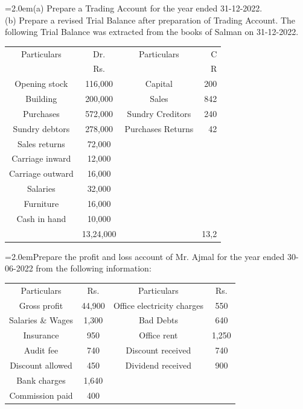 \documentclass[11pt,a4paper]{article}
\newcommand{\lqn}[2]{\Needspace{6\baselineskip}\par\medskip\noindent\hangindent=2.0em\hangafter=1\makebox[2.0em][l]{\textbf{#1.}}#2\par}
\begin{document}
\lqn{82}{(a) Prepare a Trading Account for the year ended 31-12-2022.\\
(b) Prepare a revised Trial Balance after preparation of Trading Account. The following Trial Balance was extracted from the books of Salman on 31-12-2022.\par
\par\smallskip\noindent\hspace*{1.2em}\begin{tabular}{|cccr|}
\hline
Particulars & Dr. & Particulars & C \\
 & Rs. &  & R \\
Opening stock & 116,000 & Capital & 200 \\
Building & 200,000 & Sales & 842 \\
Purchases & 572,000 & Sundry Creditors & 240 \\
Sundry debtors & 278,000 & Purchases Returns & 42 \\
Sales returns & 72,000 &  &  \\
Carriage inward & 12,000 &  &  \\
Carriage outward & 16,000 &  &  \\
Salaries & 32,000 &  &  \\
Furniture & 16,000 &  &  \\
Cash in hand & 10,000 &  &  \\
 & 13,24,000 &  & 13,2 \\
\hline
\end{tabular}\par\smallskip
}
\lqn{83}{Prepare the profit and loss account of Mr. Ajmal for the year ended 30-06-2022 from the following information:\par
\par\smallskip\noindent\hspace*{1.2em}\begin{tabular}{|cccc|}
\hline
Particulars & Rs. & Particulars & Rs. \\
Gross profit & 44,900 & Office electricity charges & 550 \\
Salaries \& Wages & 1,300 & Bad Debts & 640 \\
Insurance & 950 & Office rent & 1,250 \\
Audit fee & 740 & Discount received & 740 \\
Discount allowed & 450 & Dividend received & 900 \\
Bank charges & 1,640 &  &  \\
Commission paid & 400 &  &  \\
\hline
\end{tabular}\par\smallskip
}
\end{document}
